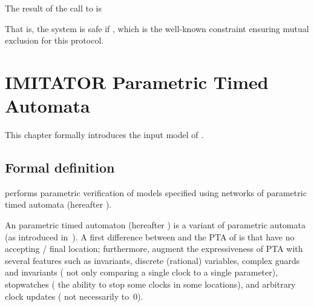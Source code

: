 

The result of the call to \imitator{} is


That is, the system is safe if , which is the well-known constraint ensuring mutual exclusion for this protocol.




\chapter{IMITATOR Parametric Timed Automata}\label{section:IPTA}


This chapter formally introduces the input model of \imitator{}.

\section{Formal definition}\label{section:NIPTA}

\imitator{} performs parametric verification of models specified using networks of \imitator{} parametric timed automata (hereafter \NIPTA{}).

An \imitator{} parametric timed automaton (hereafter \IPTA{}) is a variant of parametric automata (as introduced in~\cite{AHV93}).
A first difference between \IPTA{} and the PTA of \cite{AHV93} is that \IPTA{} have no accepting / final location;
furthermore, \IPTA{} augment the expressiveness of PTA with several features such as invariants, discrete (rational) variables, complex guards and invariants (\ie{} not only comparing a single clock to a single parameter), stopwatches (\ie{} the ability to stop some clocks in some locations), and arbitrary clock updates (\ie{} not necessarily to~0).


